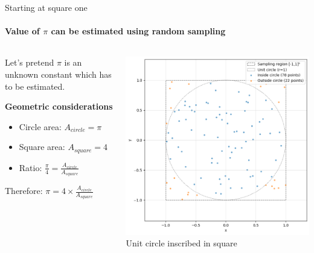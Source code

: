 \documentclass{beamer}
\begin{document}
\begin{frame}{Starting at square one}
  \framesubtitle{Value of $\pi$ can be estimated using random sampling}
  \begin{columns}[c]
    \begin{column}{0.5\textwidth}
      Let's pretend $\pi$ is an unknown constant which has to be estimated.
      \vspace{0.5cm}

      \textbf{Geometric considerations}
      \begin{itemize}
        \item Circle area: $A_{circle} = \pi$
        \item Square area: $A_{square} = 4$
        \item Ratio: $\frac{\pi}{4} = \frac{A_{circle}}{A_{square}}$
      \end{itemize}
      
      \vspace{0.5cm}
      Therefore: $\pi = 4 \times \frac{A_{circle}}{A_{square}}$
    \end{column}
    \begin{column}{0.5\textwidth}
      \begin{center}
        \includegraphics[width=\textwidth]{images/unit_circle_diagram.png}
        \\[0.2cm]
        \small{Unit circle inscribed in square}
      \end{center}
    \end{column}
  \end{columns}
\end{frame}
\end{document}

